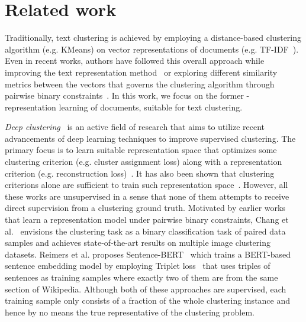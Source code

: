 \documentclass[11pt,a4paper]{article}
\begin{document}
\section{Related work}
Traditionally, text clustering is achieved by employing a distance-based clustering algorithm (e.g. KMeans) on vector representations of documents (e.g. TF-IDF~\cite{jones1972statistical}). Even in recent works, authors have followed this overall approach while improving the text representation method~\cite{chen2017improved,xu2017self,hadifar2019self} or exploring different similarity metrics between the vectors that governs the clustering algorithm through pairwise binary constraints~\cite{basu2002semi,kulis2009semi}. In this work, we focus on the former - representation learning of documents, suitable for text clustering.

\textit{Deep clustering}~\cite{min2018survey} is an active field of research that aims to utilize recent advancements of deep learning techniques to improve supervised clustering. The primary focus is to learn suitable representation space that optimizes some clustering criterion (e.g. cluster assignment loss) along with a representation criterion (e.g. reconstruction loss)~\cite{xie2016unsupervised,li2018discriminatively,ghasedi2017deep,jiang2016variational}. It has also been shown that clustering criterions alone are sufficient to train such representation space~\cite{yang2016joint}. However, all these works are unsupervised in a sense that none of them attempts to receive direct supervision from a clustering ground truth. Motivated by earlier works that learn a representation model under pairwise binary constraints, Chang et al.~\cite{chang2017deep} envisions the clustering task as a binary classification task of paired data samples and achieves state-of-the-art results on multiple image clustering datasets. Reimers et al. proposes Sentence-BERT~\cite{reimers2019sentence} which trains a BERT-based~\cite{devlin2018bert} sentence embedding model by employing Triplet loss~\cite{dor2018learning} that uses triples of sentences as training samples where exactly two of them are from the same section of Wikipedia. Although both of these approaches are supervised, each training sample only consists of a fraction of the whole clustering instance and hence by no means the true representative of the clustering problem.
\end{document}
